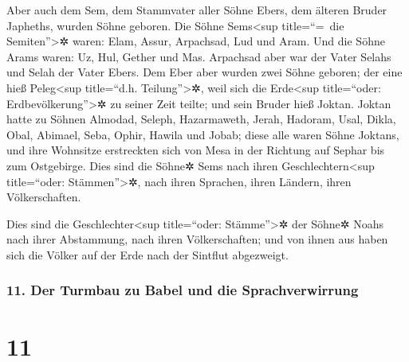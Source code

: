  Aber auch dem Sem, dem Stammvater aller Söhne Ebers, dem
älteren Bruder Japheths, wurden Söhne geboren.  Die Söhne
Sems\textless sup title=``=~die Semiten''\textgreater✲ waren: Elam,
Assur, Arpachsad, Lud und Aram.  Und die Söhne Arams
waren: Uz, Hul, Gether und Mas.  Arpachsad aber war der
Vater Selahs und Selah der Vater Ebers.  Dem Eber aber
wurden zwei Söhne geboren; der eine hieß Peleg\textless sup title=``d.h.
Teilung''\textgreater✲, weil sich die Erde\textless sup title=``oder:
Erdbevölkerung''\textgreater✲ zu seiner Zeit teilte; und sein Bruder
hieß Joktan.  Joktan hatte zu Söhnen Almodad, Seleph,
Hazarmaweth, Jerah,  Hadoram, Usal, Dikla,
 Obal, Abimael, Seba,  Ophir, Hawila und
Jobab; diese alle waren Söhne Joktans,  und ihre
Wohnsitze erstreckten sich von Mesa in der Richtung auf Sephar bis zum
Ostgebirge.  Dies sind die Söhne✲ Sems nach ihren
Geschlechtern\textless sup title=``oder: Stämmen''\textgreater✲, nach
ihren Sprachen, ihren Ländern, ihren Völkerschaften.

 Dies sind die Geschlechter\textless sup title=``oder:
Stämme''\textgreater✲ der Söhne✲ Noahs nach ihrer Abstammung, nach ihren
Völkerschaften; und von ihnen aus haben sich die Völker auf der Erde
nach der Sintflut abgezweigt.

\hypertarget{der-turmbau-zu-babel-und-die-sprachverwirrung}{%
\subsubsection{11. Der Turmbau zu Babel und die
Sprachverwirrung}\label{der-turmbau-zu-babel-und-die-sprachverwirrung}}

\hypertarget{section-10}{%
\section{11}\label{section-10}}


